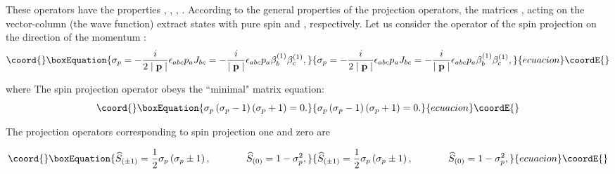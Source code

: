 \documentclass[a4paper,12pt]{article}
\begin{document}
These operators have the properties \coordHE{},
\coordHE{}, \coordHE{}, \coordHE{}. According to the general
properties of the projection operators, the matrices \coordHE{},
\coordHE{} acting on the vector-column (the wave function)
extract states with pure spin \coordHE{} and \coordHE{}, respectively. Let us
consider the operator of the spin projection on the direction of
the momentum \coordHE{}:
\begin{equation}\coord{}\boxEquation{
\sigma _p=-\frac i{2\mid \mathbf{p}\mid }\epsilon
_{abc}p_aJ_{bc}=-\frac i{\mid \mathbf{p}\mid }\epsilon
_{abc}p_a\beta _b^{(1)}\beta _c^{(1)}, \label{49}
}{
\sigma _p=-\frac i{2\mid \mathbf{p}\mid }\epsilon
_{abc}p_aJ_{bc}=-\frac i{\mid \mathbf{p}\mid }\epsilon
_{abc}p_a\beta _b^{(1)}\beta _c^{(1)}, }{ecuacion}\coordE{}\end{equation}

where \coordHE{} The spin projection operator obeys the ``minimal" matrix
equation:
\begin{equation}\coord{}\boxEquation{
\sigma _p\left( \sigma _p-1\right) \left( \sigma _p+1\right) =0.
\label{50}
}{
\sigma _p\left( \sigma _p-1\right) \left( \sigma _p+1\right) =0.
}{ecuacion}\coordE{}\end{equation}

The projection operators corresponding to spin projection one and
zero are

\begin{equation}\coord{}\boxEquation{
\widehat{S}_{(\pm 1)}=\frac 12\sigma _p\left( \sigma _p\pm
1\right), \hspace{0.5in}\widehat{S}_{(0)}=1-\sigma _p^2,
\label{51}
}{
\widehat{S}_{(\pm 1)}=\frac 12\sigma _p\left( \sigma _p\pm
1\right), \hspace{0.5in}\widehat{S}_{(0)}=1-\sigma _p^2,
}{ecuacion}\coordE{}\end{equation}
\end{document}
